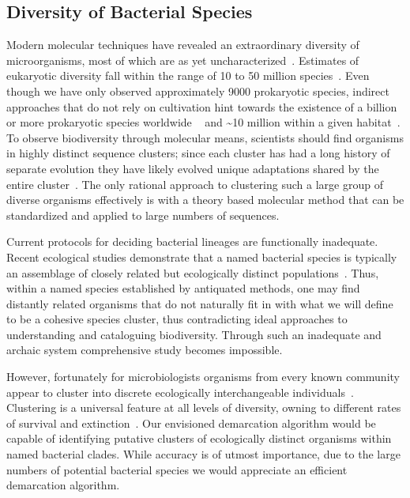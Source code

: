 \subsection{Diversity of Bacterial Species}
Modern molecular techniques have revealed an extraordinary diversity of microorganisms, most of which are as yet uncharacterized~\cite{bohannan2003new}.
Estimates of eukaryotic diversity fall within the range of 10 to 50 million species~\cite{may1988many}. Even though we have only observed approximately 9000 prokaryotic species, indirect approaches that do not rely on cultivation hint towards the existence of a billion or more prokaryotic species worldwide ~\cite{dykhuizen1998santa} and \textasciitilde10 million within a given habitat~\cite{gans2005computational}.
To observe biodiversity through molecular means, scientists should find organisms in highly distinct sequence clusters; since each cluster has had a long history of separate evolution they have likely evolved unique adaptations shared by the entire cluster~\cite{cohan2007systematics}.
The only rational approach to clustering such a large group of diverse organisms effectively is with a theory based molecular method that can be standardized and applied to large numbers of sequences.

Current protocols for deciding bacterial lineages are functionally inadequate.
Recent ecological studies demonstrate that a named bacterial species is typically an assemblage of closely related but ecologically distinct populations~\cite{cohan2007systematics}.
Thus, within a named species established by antiquated methods, one may find distantly related organisms that do not naturally fit in with what we will define to be a cohesive species cluster, thus contradicting ideal approaches to understanding and cataloguing biodiversity.
Through such an inadequate and archaic system comprehensive study becomes impossible.

However, fortunately for microbiologists organisms from every known community appear to cluster into discrete ecologically interchangeable individuals~\cite{cohan2007systematics}.
Clustering is a universal feature at all levels of diversity, owning to different rates of survival and extinction~\cite{darwin1861origin}.
Our envisioned demarcation algorithm would be capable of identifying putative clusters of ecologically distinct organisms within named bacterial clades.
While accuracy is of utmost importance, due to the large numbers of potential bacterial species we would appreciate an efficient demarcation algorithm.

